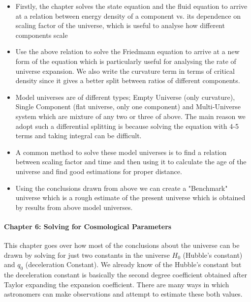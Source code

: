 \documentclass[11pt]{article}
\begin{document}
\begin{itemize}
	\item Firstly, the chapter solves the state equation and the fluid equation to arrive at a
		relation between energy density of a component vs. its
		dependence on scaling factor of the universe, which is useful to
		analyse how different components scale
	\item Use the above relation to solve the Friedmann equation to arrive
		at a new form of the equation which is particularly useful for
		analysing the rate of universe expansion. We also write the
		curvature term in terms of critical density since it gives a
		better split between ratios of different components.
	\item Model universes are of different types; Empty Universe (only
		curvature), Single Component (flat universe, only one component)
		and Multi-Universe system which are mixture of any two or three
		of above. The main reason we adopt such a differential splitting
		is because solving the equation with 4-5 terms and taking
		integral can be difficult.
	\item A common method to solve these model universes is to find a
		relation between scaling factor and time and then using it to
		calculate the age of the universe and find good estimations for
		proper distance.
	\item Using the conclusions drawn from above we can create a "Benchmark"
		universe which is a rough estimate of the present universe which
		is obtained by results from above  model universes.

\end{itemize}

\paragraph{Chapter 6: Solving for Cosmological Parameters}

This chapter goes over how most of the conclusions about the universe can be
drawn by solving for just two constants in the universe $H_0$ (Hubble's constant)
and $q_0$ (deceleration Constant). We already know of the Hubble's constant but
the deceleration constant is basically the second degree coefficient obtained
after Taylor expanding the expansion coefficient. There are many ways in which
astronomers can make observations and attempt to estimate these both values.
\end{document}

